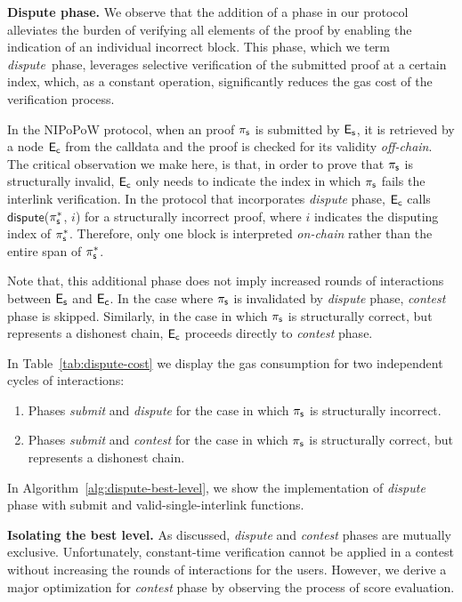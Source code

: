 \newcommand{\dispute}{\emph{dispute\ }} \noindent \textbf{Dispute phase.} We
observe that the addition of a phase in our protocol alleviates the burden of
verifying all elements of the proof by enabling the indication of an individual
incorrect block. This phase, which we term \dispute phase, leverages selective
verification of the submitted proof at a certain index, which, as a constant
operation, significantly reduces the gas cost of the verification process.

In the NIPoPoW protocol, when an proof $\mathsf{\pi_{s}}$ is submitted by $\mathsf{E_{s}}$, it is
retrieved by a node $\mathsf{E_{c}}$ from the calldata and the proof is checked for its
validity \emph{off-chain}. The critical observation we make here, is that, in
order to prove that $\mathsf{\pi_{s}}$ is structurally invalid, $\mathsf{E_{c}}$ only needs to
indicate the index in which $\mathsf{\pi_{s}}$ fails the interlink verification. In the
protocol that incorporates \emph{dispute} phase, $\mathsf{E_{c}}$ calls
$\textsf{dispute}$($\mathsf{\pi_{s}^*}$, $i$) for a structurally incorrect proof, where $i$
indicates the disputing index of $\mathsf{\pi_{s}^*}$. Therefore, only one block is
interpreted \emph{on-chain} rather than the entire span of $\mathsf{\pi_{s}^*}$.

Note that, this additional phase does not imply increased rounds of
interactions between $\mathsf{E_{s}}$ and $\mathsf{E_{c}}$. In the case where $\mathsf{\pi_{s}}$ is invalidated
by \emph{dispute} phase, \emph{contest} phase is skipped.  Similarly, in the
case in which $\mathsf{\pi_{s}}$ is structurally correct, but represents a dishonest
chain, $\mathsf{E_{c}}$ proceeds directly to \emph{contest} phase.

In Table~\ref{tab:dispute-cost} we display the gas consumption for
two independent cycles of interactions:
\begin{enumerate}
    \item Phases \emph{submit} and \emph{dispute} for the case in which $\mathsf{\pi_{s}}$
is structurally incorrect.
    \item Phases \emph{submit} and \emph{contest} for the case in which
$\mathsf{\pi_{s}}$ is structurally correct, but represents a dishonest chain.
\end{enumerate}
\noindent
In Algorithm~\ref{alg:dispute-best-level}, we show the implementation of
\emph{dispute} phase with \textsf{submit} and \textsf{valid-single-interlink}
functions.



\noindent
\textbf{Isolating the best level.} As discussed, \emph{dispute} and
\emph{contest} phases are mutually exclusive. Unfortunately, constant-time
verification cannot be applied in a contest without increasing the rounds
of interactions for the users. However, we derive a major
optimization for \emph{contest} phase by observing the process of score
evaluation.

